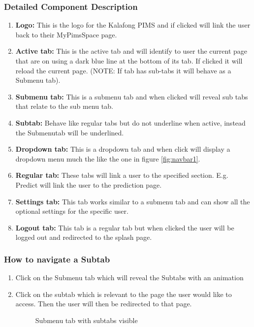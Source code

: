 \documentclass[14pt, a4paper]{article}
\begin{document}
	\subsubsection{Detailed Component Description}
		\begin{enumerate}
			\item \textbf{Logo:} This is the logo for the Kalafong PIMS and if clicked will link the user back to their MyPimsSpace page.
			\item \textbf{Active tab:} This is the active tab and will identify to user the current page that are on using a dark blue line at the bottom of its tab. If clicked it will reload the current page. (NOTE: If tab has sub-tabs it will behave as a Submenu tab).
			\item \textbf{Submenu tab:} This is a submenu tab and when clicked will reveal sub tabs that relate to the sub menu tab.
			\item \textbf{Subtab:} Behave like regular tabs but do not underline when active, instead the Submenutab will be underlined.
			\item \textbf{Dropdown tab: } This is a dropdown tab and when click will display a dropdown menu much the like the one in figure \ref{fig:navbar1}.
			\item \textbf{Regular tab: } These tabs will link a user to the specified section. E.g. Predict will link the user to the prediction page.
			\item \textbf{Settings tab:} This tab works similar to a submenu tab and can show all the optional settings for the specific user.
			\item \textbf{Logout tab:} This tab is a regular tab but when clicked the user will be logged out and redirected to the splash page.
		\end{enumerate}
	\subsubsection{How to navigate a Subtab}
		\begin{enumerate}
			\item Click on the Submenu tab which will reveal the Subtabs with an animation
			\item Click on the subtab which is relevant to the page the user would like to access. Then the user will then be redirected to that page.
			\begin{figure}[H]
				\centerline{}
				\caption{Submenu tab with subtabs visible}
				\label{fig:navbar2}
			\end{figure}
		\end{enumerate}
\end{document}
